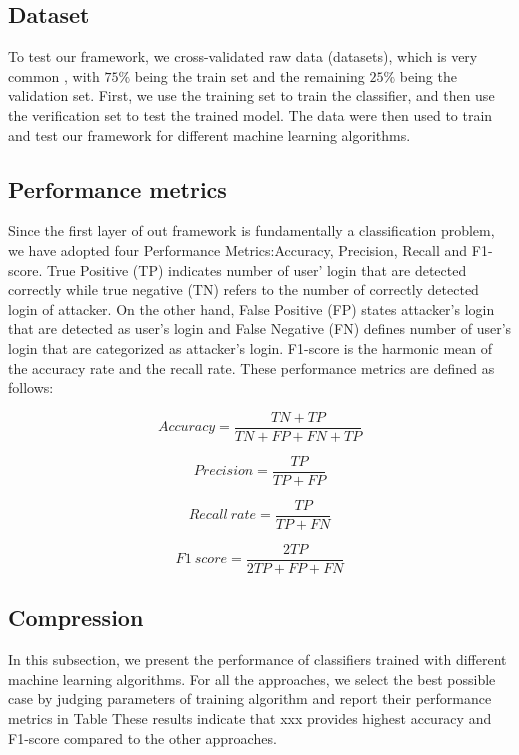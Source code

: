 \subsection{Dataset}
To test our framework, we cross-validated raw data (datasets), which is very common \cite{Uluagac2013A}, with $75\%$ being the train set and the remaining $25\%$ being the validation set. First, we use the training set to train the classifier, and then use the verification set to test the trained model. The data were then used to train and test our framework for different machine learning algorithms.


\subsection{Performance metrics}
Since the first layer of out framework is fundamentally a classification problem, we have adopted four Performance Metrics:Accuracy, Precision, Recall and F1-score. True Positive (TP) indicates number of user' login that are detected correctly while true negative (TN) refers to the number of correctly detected login of attacker. On the other hand, False Positive (FP) states attacker's login that are detected as user's login and False Negative (FN) defines number of user's login that are categorized as attacker's login. F1-score is the harmonic mean of the accuracy rate and the recall rate. These performance metrics are defined as follows:

\begin{equation}\label{eq:12}
Accuracy=\frac{TN+TP}{TN+FP+FN+TP}
\end{equation}

\begin{equation}\label{eq:12}
Precision=\frac{TP}{TP+FP}
\end{equation}

\begin{equation}\label{eq:12}
Recall \ rate = \frac{TP}{TP+FN}
\end{equation}

\begin{equation}\label{eq:12}
F1 \ score =\frac{2TP}{2TP+FP+FN}
\end{equation}




\subsection{Compression}
In this subsection, we present the performance of classifiers trained with different machine learning algorithms.
For all the approaches, we select the best possible case by judging parameters of training algorithm and report their performance metrics in Table \uppercase\expandafter{}
These results indicate that xxx provides highest accuracy and F1-score compared to the other approaches.

